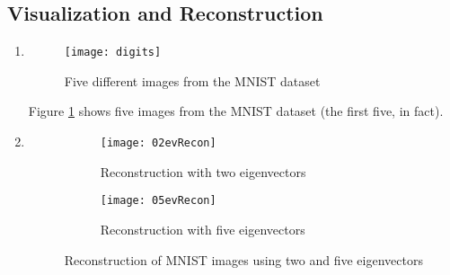 \documentclass{article}
\begin{document}
\subsection{Visualization and Reconstruction}
\begin{enumerate}
	\item 
	\begin{figure}
        \centering
        \texttt{[image: digits]}
        \caption{Five different images from the MNIST dataset} 
        \label{fig:digits}
    \end{figure}
    Figure \ref{fig:digits} shows five images from the MNIST dataset (the first five, in fact).
    \item 
    \begin{figure}
        \centering
        \begin{subfigure}[b]{0.95\textwidth}
        	\centering
        	\texttt{[image: 02evRecon]}
        	\caption{Reconstruction with two eigenvectors}
        	\label{fig:2ev}
        \end{subfigure}
        \begin{subfigure}[b]{0.95\textwidth}
        	\centering
        	\texttt{[image: 05evRecon]}
        	\caption{Reconstruction with five eigenvectors}
        	\label{fig:4ev}
        \end{subfigure}
        \caption{Reconstruction of MNIST images using two and five eigenvectors}
        \label{fig:evRecons1}
    \end{figure}


\end{enumerate}
\end{document}
